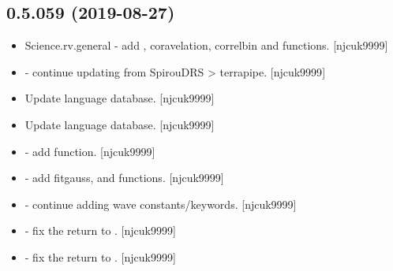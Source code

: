 \documentclass[a4paper,10pt,english]{report}
\begin{document}
\subsection{0.5.059 (2019-08-27)}
\label{\detokenize{misc/changelog:id83}}\begin{itemize}
\item {} 
Science.rv.general - add , coravelation, 
 correlbin and  functions. {[}njcuk9999{]}

\item {} 
 - continue updating from SpirouDRS \textendash{}\textgreater{} terrapipe.
{[}njcuk9999{]}

\item {} 
Update language database. {[}njcuk9999{]}

\item {} 
Update language database. {[}njcuk9999{]}

\item {} 
 - add  function. {[}njcuk9999{]}

\item {} 
 - add fitgauss,  and  functions. {[}njcuk9999{]}

\item {} 
 - continue adding wave constants/keywords.
{[}njcuk9999{]}

\item {} 
 - fix the return to . {[}njcuk9999{]}

\item {} 
 - fix the return to . {[}njcuk9999{]}

\end{itemize}
\end{document}
